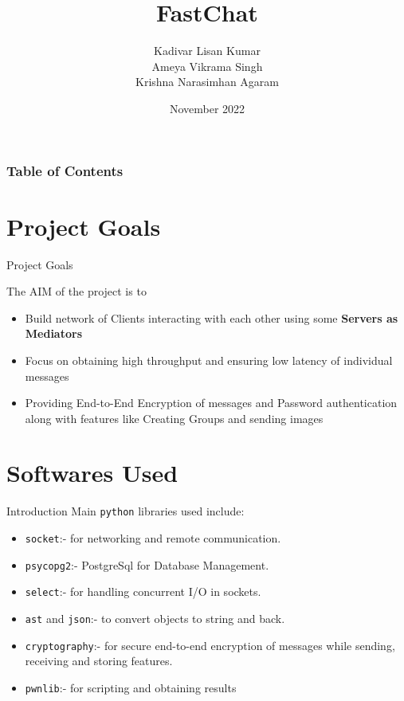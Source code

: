 \documentclass{beamer}
\title[FastChat] 
{FastChat}
\author[Konigsberg]{Kadivar Lisan Kumar \\ Ameya Vikrama Singh \\ Krishna Narasimhan Agaram}
\institute[IITB] 
{
  IIT Bombay
}
\date[2022]
{November 2022}
\renewcommand{\t}[1]{\texttt{#1}}
\begin{document}
\frame{\titlepage}

\begin{frame}
\frametitle{Table of Contents}
\tableofcontents
\end{frame}

\section{Project Goals}
\begin{frame}{Project Goals}

The AIM of the project is to
\begin{itemize}
    \item Build network of Clients interacting with each other using some \textbf{Servers as Mediators}
    \item Focus on obtaining high throughput and ensuring low latency of individual messages
    \item Providing End-to-End Encryption of messages and Password authentication along with features like Creating Groups and sending images
\end{itemize}

\end{frame}

\section{Softwares Used}
\begin{frame}{Introduction}
Main \t{python} libraries used include:
\begin{itemize}
    \item \t{socket}:- for networking and remote communication.
    \item \t{psycopg2}:- PostgreSql for Database Management.
    \item \t{select}:- for handling concurrent I/O in sockets.
    \item \t{ast} and \t{json}:- to convert objects to string and back.
    \item \t{cryptography}:- for secure end-to-end encryption of messages while sending, receiving and storing features.
    \item \t{pwnlib}:- for scripting and obtaining results
\end{itemize}
\end{frame}
\end{document}
